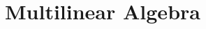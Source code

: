 \documentclass{dwnotes}
\begin{document}
\renewcommand{\dyad}[1]{\boldsymbol{\rm #1}}
\section{Multilinear Algebra}
\label{sec:tensors}
\end{document}
